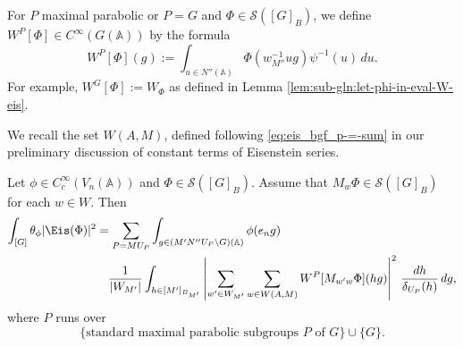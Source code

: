 For $P$ maximal parabolic or $P = G$ and $\Phi \in \mathcal{S}([G]_B)$, we define $W^P[\Phi] \in C^\infty(G(\mathbb{A}))$ by the formula 
\begin{equation*}
  W^P[\Phi](g) := \int_{u \in N''(\mathbb{A}) } \Phi(w_{M''}^{-1} u g) \psi^{-1}(u) \, d u.
\end{equation*}
For example, $W^G[\Phi] := W_{\Phi}$ as defined in Lemma \ref{lem:sub-gln:let-phi-in-eval-W-eis}.

We recall the set $W(A,M)$, defined following \eqref{eq:eis_bgf_p-=-sum} in our preliminary discussion of constant terms of Eisenstein series.

\begin{proposition}\label{prop:sub-gln:let-phi-in-summary}
  Let $\phi \in C_c^\infty(V_n(\mathbb{A}))$ and $\Phi \in \mathcal{S}([G]_B)$.  Assume that $M_w \Phi \in \mathcal{S}([G]_B)$ for each $w \in W$.  Then
  \begin{align}
    \int_{[G]} \theta_\phi |\Eis(\Phi)|^2  \label{prop:=-sum_p-=}
    &=
      \sum_{P = M {U_P}}
      \int_{g \in (M' N'' {U_P} \backslash G)(\mathbb{A}) } \phi(e_n g) \\ \nonumber
    &\quad
      \frac{1}{|W_{M'}|}
      \int_{h \in [M']_{B_{M'}}}
      \left\lvert
      \sum_{w' \in W_{M'}}
      \sum_{w \in W(A,M)}
      W^P[M_{w' w} \Phi](h g)
      \right\rvert^2
      \, \frac{d h}{\delta_{U_P}(h)}
      \, d g,
  \end{align}
  where $P$ runs over
  \begin{equation*}
    \{\text{standard maximal parabolic subgroups $P$ of $G$}\} \cup \{G\}.
  \end{equation*}
\end{proposition}
